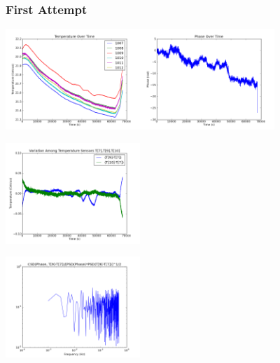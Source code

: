 \documentclass[notes, compressed, blue]{beamer}
\begin{document}
\begin{frame}
\frametitle{First Attempt}

\begin{center}\includegraphics[width=2in]{Figure2.png}\includegraphics[width=2in]{Figure3.png}\end{center}
\begin{center}\noindent\includegraphics[width=2in]{Tempdiff_7-9-10.png}\end{center}

\end{frame}



\begin{frame}
\includegraphics[width=2in]{CSD_phase_9-7_PSD.png}
\end{frame}
\end{document}
